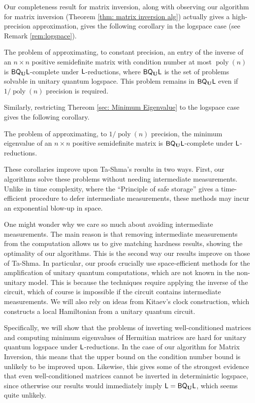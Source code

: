 \documentclass[a4paper,UKenglish]{lipics-v2016}
\newcommand\Logspace{{\sf{L}}}
\newcommand{\classfont}{\sf}
\newcommand{\Unitary}{\mathbf{U}}
\newcommand{\unitaryBQL}{{\classfont{BQ}_\Unitary\classfont{L}}}
\DeclareMathOperator{\poly}{poly}
\begin{document}
Our completeness result for matrix inversion, along with observing our algorithm for matrix inversion (Theorem \ref{thm: matrix inversion alg}) actually gives a high-precision approximation, gives the following corollary in the logspace case (see Remark \ref{rem:logspace}).
\begin{corollary}
The problem of approximating, to constant precision, an entry of the inverse of an $n \times n$ positive semidefinite matrix with condition number at most $\poly(n)$ is $\unitaryBQL$-complete under $\Logspace$-reductions, where $\unitaryBQL$ is the set of problems solvable in unitary quantum logspace. This problem remains in $\unitaryBQL$ even if $1/\poly(n)$ precision is required.
\end{corollary}

Similarly, restricting Thereom \ref{sec: Minimum Eigenvalue} to the logspace case gives the following corollary.
\begin{corollary}
The problem of approximating, to $1/\poly(n)$ precision, the minimum eigenvalue of an $n \times n$ positive semidefinite matrix is $\unitaryBQL$-complete under $\Logspace$-reductions.
\end{corollary}

These corollaries improve upon Ta-Shma's results \cite{tashma} in two ways. First, our algorithms  solve these problems without needing intermediate measurements.  Unlike in time complexity, where the ``Principle of safe storage'' gives a time-efficient procedure to defer intermediate measurements, these methods may incur an exponential blow-up in space.  

One might wonder why we care so much about avoiding intermediate measurements.  The main reason is that removing intermediate measurements from the computation allows us to give matching hardness results, showing the optimality of our algorithms.  This is the second way our results improve on those of Ta-Shma.  In particular, our proofs crucially use space-efficient methods for the amplification of unitary quantum computations, which are not known in the non-unitary model.  This is because the techniques require applying the inverse of the circuit, which of course is impossible if the circuit contains intermediate measurements.  We will also rely on ideas from Kitaev's clock construction, which constructs a local Hamiltonian from a unitary quantum circuit. 

Specifically, we will show that the problems of inverting well-conditioned matrices and computing minimum eigenvalues of Hermitian matrices are hard for unitary quantum logspace under $\Logspace$-reductions. In the case of our algorithm for Matrix Inversion, this means that the upper bound on the condition number bound is unlikely to be improved upon.  Likewise, this gives some of the strongest evidence that even well-conditioned matrices cannot be inverted in deterministic logspace, since otherwise our results would immediately imply $\Logspace=\unitaryBQL$, which seems quite unlikely. 
\end{document}
